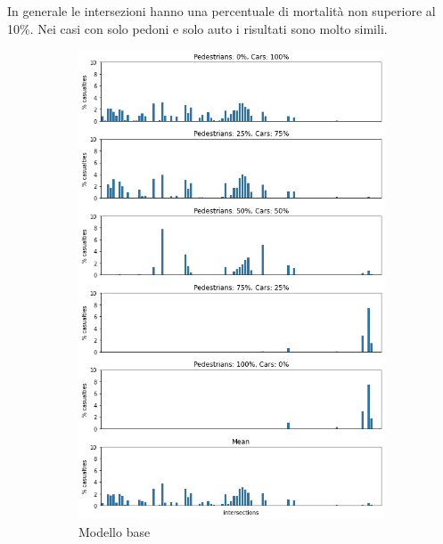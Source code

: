 In generale le intersezioni hanno una percentuale di mortalità non superiore al 10\%.
Nei casi con solo pedoni e solo auto i risultati sono molto simili.


\begin{figure}[ht]
    \centering
    \begin{subfigure}{0.475\textwidth}
        \centering
        \includegraphics[width=\textwidth]{images/analisi/comparison-critical-ints-base.png}
        \caption{Modello base}
        \label{fig:base-ints-casualties}
    \end{subfigure}
    \hfill
    \begin{subfigure}{0.475\textwidth}
        \centering

\end{subfigure}
\end{figure}

